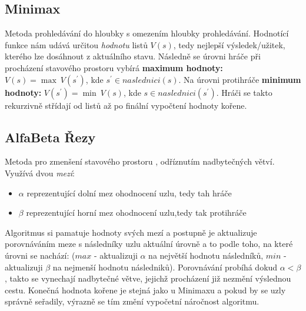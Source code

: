 \subsection{Minimax}
Metoda \cite{AI1}prohledávání do hloubky s omezením hloubky prohledávání. Hodnotící funkce nám udává určitou \textit{hodnotu} listů $V(s)$, tedy nejlepší výsledek/užitek, kterého lze dosáhnout z aktuálního stavu.
Následně se úrovni hráče při procházení stavového prostoru vybírá \textbf{maximum hodnoty:} $V(s) = \max \: V(s^\prime)$, kde $s^\prime \in naslednici(s)$. 
\newline
Na úrovni protihráče \textbf{minimum hodnoty:} $V(s^\prime) = \min \: V(s)$, kde $s \in naslednici(s^\prime)$. Hráči se takto rekurzivně střídají od listů až po finální vypočtení hodnoty kořene.

\subsection{AlfaBeta Řezy}
Metoda pro zmenšení stavového prostoru \cite{AI1}, odříznutím nadbytečných větví. Využívá dvou \textit{mezí}:
\begin{itemize}
\item \boldmath$\alpha$ reprezentující dolní mez ohodnocení uzlu, tedy tah hráče
\item \boldmath$\beta$ reprezentující horní mez ohodnocení uzlu,tedy tak protihráče
\end{itemize}
Algoritmus si pamatuje hodnoty svých mezí a postupně je aktualizuje porovnáváním meze s následníky uzlu aktuální úrovně a to podle toho, na které úrovni se nachází: ($max$ - aktualizuji $\alpha$ na největší hodnotu následníků, $min$ - aktualizuji $\beta$ na nejmenší hodnotu následniků). Porovnávání probíhá dokud $\alpha < \beta$, takto se vynechají nadbytečné větve, jejichž procházení již nezmění výslednou cestu. Konečná hodnota kořene je stejná jako u Minimaxu a pokud by se uzly správně seřadily, výrazně se tím změní vypočetní náročnost algoritmu. 
